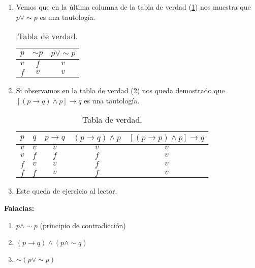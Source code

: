 \solu
\begin{enumerate}
\item Vemos que en la última columna de la tabla de verdad (\ref{tau1})
nos muestra que $p\vee\sim p$ es una tautología. 
\begin{table}[H]
\centering

\caption{Tabla de verdad.}
\label{tau1}

\begin{tabular}{c|c|c}
\arrayrulecolor{ptctitle}\cellcolor{ptctitle!50}$p$ &
\cellcolor{ptctitle!50}$\sim p$ &
\cellcolor{ptctitle!50}$p\vee\sim p$\tabularnewline
\hline 
\cellcolor{ptcbackground} $v$ &
\cellcolor{ptcbackground}$f$ &
\cellcolor{ptcbackground}$v$\tabularnewline
\hline 
\cellcolor{gray!50}$f$ &
\cellcolor{gray!50} $v$ &
\cellcolor{gray!50}$v$\tabularnewline
\hline 
\end{tabular}
\end{table}
\item Si observamos en la tabla de verdad (\ref{tau2}) nos queda demostrado
que $\left[(p\rightarrow q)\wedge p\right]\rightarrow q$ es una tautología.
\begin{table}[H]
\centering

\caption{Tabla de verdad.}
\label{tau2}

\begin{tabular}{c|c|c|c|c}
\arrayrulecolor{ptctitle}\cellcolor{ptctitle!50}$p$ &
\cellcolor{ptctitle!50}$q$ &
\cellcolor{ptctitle!50}$p\rightarrow q$ &
\cellcolor{ptctitle!50}$\left(p\rightarrow q\right)\wedge p$ &
\cellcolor{ptctitle!50}$\left[\left(p\rightarrow p\right)\wedge p\right]\rightarrow q$\tabularnewline
\hline 
\cellcolor{ptcbackground} $v$ &
\cellcolor{ptcbackground}$v$ &
\cellcolor{ptcbackground}$v$ &
\cellcolor{ptcbackground}$v$ &
\cellcolor{ptcbackground}$v$\tabularnewline
\hline 
\cellcolor{gray!50}$v$ &
\cellcolor{gray!50} $f$ &
\cellcolor{gray!50}$f$ &
\cellcolor{gray!50}$f$ &
\cellcolor{gray!50}$v$\tabularnewline
\hline 
\cellcolor{ptcbackground}$f$ &
\cellcolor{ptcbackground} $v$ &
\cellcolor{ptcbackground} $v$ &
\cellcolor{ptcbackground}$f$ &
\cellcolor{ptcbackground}$v$\tabularnewline
\hline 
\cellcolor{gray!50} $f$ &
\cellcolor{gray!50} $f$ &
\cellcolor{gray!50} $v$ &
\cellcolor{gray!50}$f$ &
\cellcolor{gray!50}$v$\tabularnewline
\hline 
\end{tabular}
\end{table}
\item Este queda de ejercicio al lector.
\end{enumerate}
\begin{ejemplo}{\bf Falacias:}
\begin{enumerate}
\item $p\wedge\sim p$ (principio de contradicción) 
\item $(p\rightarrow q)\wedge\left(p\wedge\sim q\right)$
\item $\sim\left(p\vee\sim p\right)$
\end{enumerate}
\end{ejemplo}

